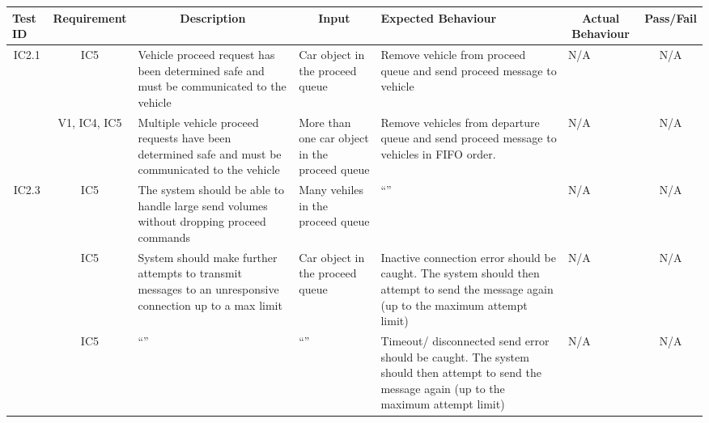 \documentclass [10pt]{article}
\begin{document}
    
 \begin{longtable}{ | p{ } | p{ } |  p{ } |  p{ } | p{ } | p{ } |  p{ } |}  \hline

    \rowcolor{subsectionC}\textbf{Test ID}
    & \multicolumn{1}{c|}{\textbf{Requirement} }
    &\multicolumn{1}{c|}{\textbf{Description} }
    & \multicolumn{1}{c|}{\textbf{Input} }
    & \textbf{Expected Behaviour} 
    & \multicolumn{1}{c|}{\textbf{Actual Behaviour} }
    & \multicolumn{1}{c|}{\textbf{Pass/Fail}} \\  \hline
    
   
    \multicolumn{1}{|c|}{IC2.1} 
    & \multicolumn{1}{c|}{IC5}
    & Vehicle proceed request has been determined safe and must be communicated to the vehicle
    & Car object in the proceed queue
    & Remove vehicle from proceed queue and send proceed message to vehicle 
    & N/A
    & \multicolumn{1}{|c|}{N/A}\\ \hline
    
  
    \rowcolor{tableCell}\multicolumn{1}{|c|}{IC2.2} 
    & \multicolumn{1}{c|}{V1, IC4, IC5}
    & Multiple vehicle proceed requests have been determined safe and must be communicated to the vehicle
    & More than one car object in the proceed queue
    & Remove vehicles from departure queue and send proceed message to vehicles in FIFO order.  
    & N/A
    & \multicolumn{1}{|c|}{N/A}\\ \hline
    
    
    \multicolumn{1}{|c|}{IC2.3} 
    & \multicolumn{1}{c|}{IC5}
    & The system should be able to handle large send volumes without dropping proceed commands
    & Many vehiles in the proceed queue
    & ``''
    & N/A
    & \multicolumn{1}{|c|}{N/A}\\ \hline
    
    
   
    \rowcolor{tableCell}\multicolumn{1}{|c|}{IC2.4} 
    & \multicolumn{1}{c|}{IC5}
    & System should make further attempts to transmit messages to an unresponsive connection  up to a max limit 
    & Car object in the proceed queue
    & Inactive connection error should be caught. The system should then attempt to send the message again (up to the maximum attempt limit)
    & N/A
    & \multicolumn{1}{|c|}{N/A}\\  \hline
    
    \pagebreak \hline
   
    
    \multicolumn{1}{|c|}{IC2.5} 
    & \multicolumn{1}{c|}{IC5}
    & ``''
    & ``'' 
    &  Timeout/ disconnected send error should be caught.  The system should then attempt to send the message again (up to the maximum attempt limit)
    & N/A
    & \multicolumn{1}{|c|}{N/A}\\ \hline
    
    \end{longtable}
    
\end{document}
